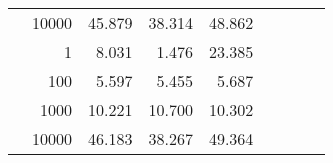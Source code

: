 \begin{table}
\begin{tabular}{rrrrrrrrr}
	            
					 &  
					 
					\multirow{ 1 }{*}{ 10000 } &
					
						
							    
							    
	                           45.879 & 38.314 & 48.862  \\
	                
	            
	        
				\noalign{\smallskip}\hline
				\multirow{ 4 }{*}{ 2000000 } &
				
					
					 
					\multirow{ 1 }{*}{ 1 } &
					
						
							    
							    
	                           8.031 & 1.476 & 23.385  \\
	                
	            
					 &  
					 
					\multirow{ 1 }{*}{ 100 } &
					
						
							    
							    
	                           5.597 & 5.455 & 5.687  \\
	                
	            
					 &  
					 
					\multirow{ 1 }{*}{ 1000 } &
					
						
							    
							    
	                           10.221 & 10.700 & 10.302  \\
	                
	            
					 &  
					 
					\multirow{ 1 }{*}{ 10000 } &
					
						
							    
							    
	                           46.183 & 38.267 & 49.364  \\
	                
	            
	        

\hline

\end{tabular}
\end{table}
\clearpage


	    

